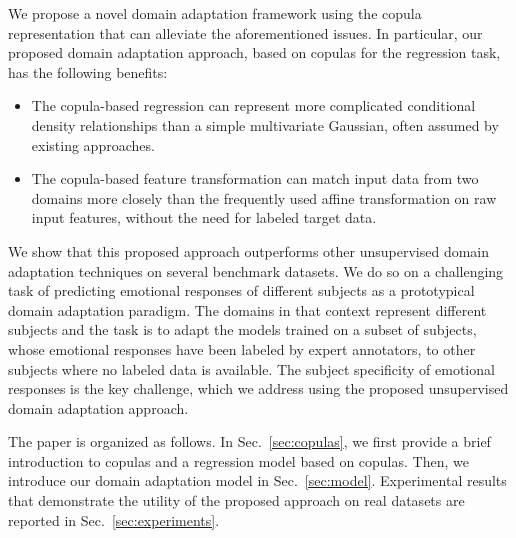 \documentclass{article}
\begin{document}
We propose a novel domain adaptation framework using the copula representation that can alleviate the aforementioned issues. In particular, our proposed domain adaptation approach, 
based on copulas for the regression task, has the following benefits:
	\begin{itemize}
		\item The copula-based regression can represent more complicated conditional density relationships than a simple multivariate Gaussian, often assumed by existing approaches. 
		\item The copula-based feature transformation can match input data from two domains more closely than the frequently used affine transformation on raw input features, without the need for labeled target data. 
	\end{itemize}
We show that this proposed approach outperforms other unsupervised domain adaptation techniques on several benchmark datasets. We do so on a challenging task of predicting emotional responses of different subjects as a prototypical domain adaptation paradigm. The domains in that context represent different subjects and the task is to adapt the models trained on a subset of subjects, whose emotional responses have been labeled by expert annotators, to other subjects where no labeled data is available.  The subject specificity of emotional responses is the key challenge, which we address using the proposed unsupervised domain adaptation approach.

The paper is organized as follows. In Sec.~\ref{sec:copulas}, we first provide a brief introduction to copulas and a regression model based on copulas. Then, we introduce our domain adaptation model in Sec.~\ref{sec:model}. Experimental results that demonstrate the utility of the proposed approach on real datasets are reported in Sec.~\ref{sec:experiments}. 
	
	
\end{document}

